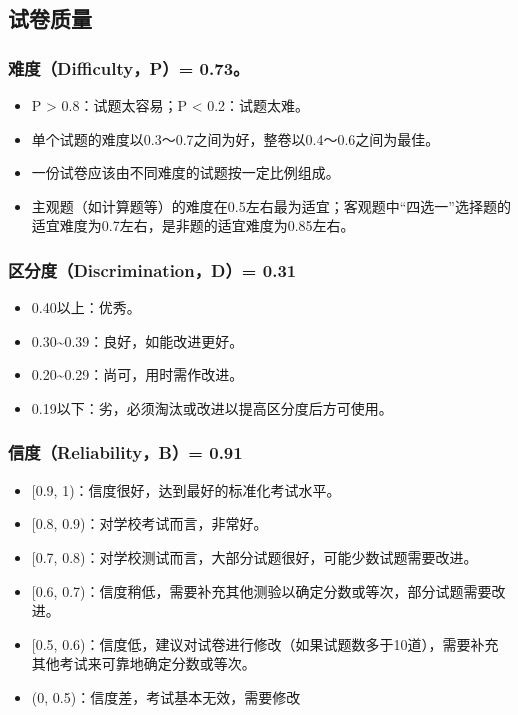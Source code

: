 \documentclass[hyperref,adobefonts]{ctexart}
\providecommand{\tightlist}{\setlength{\itemsep}{0pt}\setlength{\parskip}{0pt}}
\begin{document}
\subsection{试卷质量}

\subsubsection{难度（Difficulty，P）= 0.73。}\label{difficultyp-0.73}

\begin{itemize}
\tightlist
\item
  P \textgreater{} 0.8：试题太容易；P \textless{} 0.2：试题太难。
\item
  单个试题的难度以0.3～0.7之间为好，整卷以0.4～0.6之间为最佳。
\item
  一份试卷应该由不同难度的试题按一定比例组成。
\item
  主观题（如计算题等）的难度在0.5左右最为适宜；客观题中``四选一''选择题的适宜难度为0.7左右，是非题的适宜难度为0.85左右。
\end{itemize}

\subsubsection{区分度（Discrimination，D）=
0.31}\label{discriminationd-0.31}

\begin{itemize}
\tightlist
\item
  0.40以上：优秀。
\item
  0.30\textasciitilde{}0.39：良好，如能改进更好。
\item
  0.20\textasciitilde{}0.29：尚可，用时需作改进。
\item
  0.19以下：劣，必须淘汰或改进以提高区分度后方可使用。
\end{itemize}

\subsubsection{信度（Reliability，B）= 0.91}\label{reliabilityb-0.91}

\begin{itemize}
\tightlist
\item
  {[}0.9, 1)：信度很好，达到最好的标准化考试水平。
\item
  {[}0.8, 0.9)：对学校考试而言，非常好。
\item
  {[}0.7, 0.8)：对学校测试而言，大部分试题很好，可能少数试题需要改进。
\item
  {[}0.6,
  0.7)：信度稍低，需要补充其他测验以确定分数或等次，部分试题需要改进。
\item
  {[}0.5,
  0.6)：信度低，建议对试卷进行修改（如果试题数多于10道），需要补充其他考试来可靠地确定分数或等次。
\item
  (0, 0.5)：信度差，考试基本无效，需要修改
\end{itemize}
\end{document}
